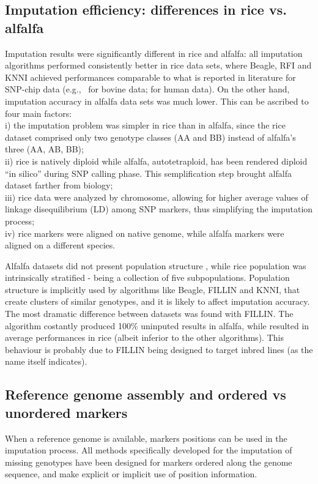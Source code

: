 \subsection{Imputation efficiency: differences in rice vs. alfalfa}
\label{sec:role_of_species}
Imputation results were significantly different in rice and alfalfa: all imputation algorithms performed consistently better in rice data sets, where Beagle, RFI and KNNI achieved performances comparable to what is reported in literature for SNP-chip data (e.g.,~\cite{vanraden_genomic_2013} for bovine data;
\cite{the_1000_genomes_project_consortium_integrated_2012}
for human data). On the other hand, imputation accuracy in alfalfa data sets was much lower. This can be ascribed to four main factors: \\
i) the imputation problem was simpler in rice than in alfalfa, since the rice dataset comprised only two genotype classes (AA and BB) instead of alfalfa's three (AA, AB, BB); \\
ii) rice is natively diploid while alfalfa, autotetraploid, has been rendered diploid ``in silico'' during SNP calling phase. This semplification step brought alfalfa dataset farther from biology;\\
iii) rice data were analyzed by chromosome, allowing for higher average values of linkage disequilibrium (LD) among SNP markers, thus simplifying the imputation process;\\
iv) rice markers were aligned on native genome, while alfalfa markers were aligned on a different species.

Alfalfa datasets did not present population structure \cite{Annicchiarico2015}, while rice population was intrinsically stratified - being a collection of five subpopulations. Population structure is implicitly used by algorithms like Beagle, FILLIN and KNNI, that create clusters of similar genotypes, and it is likely to affect imputation accuracy.\\
The most dramatic difference between datasets was found with FILLIN. The algorithm costantly produced 100\% uninputed results in alfalfa, while resulted in average performances in rice (albeit inferior to the other algorithms). This behaviour is probably due to FILLIN being designed to target inbred lines (as the name itself indicates).

\subsection{Reference genome assembly and ordered vs unordered markers}
\label{sec:reference_genome_ordered_vs_unordered}
When a reference genome is available, markers positions can be used in the imputation process. All methods specifically developed for the imputation of missing genotypes have been designed for markers ordered along the genome sequence, and make explicit or implicit use of position information.

